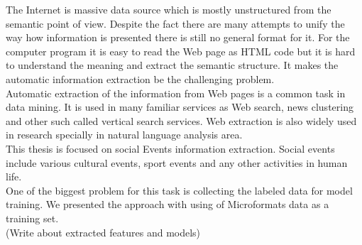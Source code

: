 \abstractpage

The Internet is massive data source which is mostly unstructured from the semantic point of view. Despite the fact there are many attempts to unify the way how information is presented there is still no general format for it. For the computer program it is easy to read the Web page as HTML code but it is hard to understand the meaning and extract the semantic structure. It makes the automatic information extraction be the challenging problem. \\

Automatic extraction of the information from Web pages is a common task in data mining. It is used in many familiar services as Web search, news clustering and other such called vertical search services. Web extraction is also widely used in research specially in natural language analysis area. \\ 

This thesis is focused on social Events information extraction. Social events include various cultural events, sport events and any other activities in human life. \\

One of the biggest problem for this task is collecting the labeled data for model training. We presented the approach with using of Microformats data as a training set. \\

(Write about extracted features and models)
